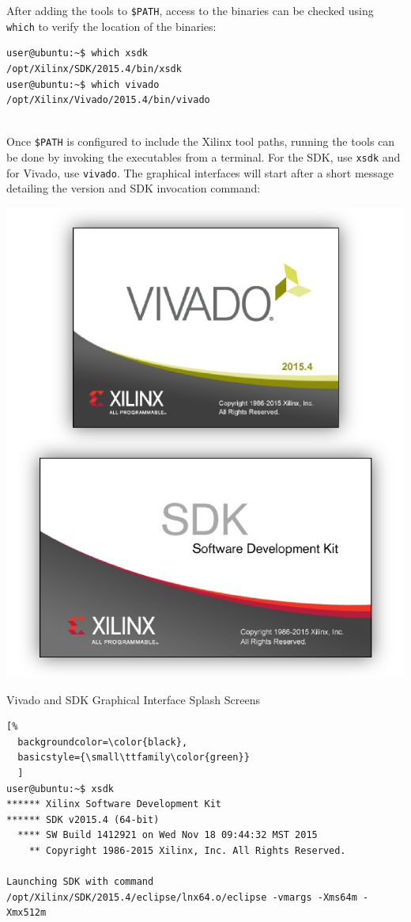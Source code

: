 \noindent
After adding the tools to \texttt{\$PATH}, access to the binaries can be checked using \texttt{which} to verify the location of the binaries: \\

\begin{lstlisting}
user@ubuntu:~$ which xsdk
/opt/Xilinx/SDK/2015.4/bin/xsdk
user@ubuntu:~$ which vivado
/opt/Xilinx/Vivado/2015.4/bin/vivado
\end{lstlisting}

~\\
\noindent
Once \texttt{\$PATH} is configured to include the Xilinx tool paths, running the tools can be done by invoking the executables from a terminal. For the SDK, use \texttt{xsdk} and for Vivado, use \texttt{vivado}. The graphical interfaces will start after a short message detailing the version and SDK invocation command:

\begin{marginfigure}
	\centering
	\includegraphics{images/SDK_Vivado_Splash.png}
	\caption[Vivado and SDK Graphical Interface Splash Screens]{Vivado and SDK Graphical Interface Splash Screens}
\end{marginfigure}


\begin{lstlisting}[%
  backgroundcolor=\color{black},
  basicstyle={\small\ttfamily\color{green}}
  ]
user@ubuntu:~$ xsdk
****** Xilinx Software Development Kit
****** SDK v2015.4 (64-bit)
  **** SW Build 1412921 on Wed Nov 18 09:44:32 MST 2015
    ** Copyright 1986-2015 Xilinx, Inc. All Rights Reserved.

Launching SDK with command /opt/Xilinx/SDK/2015.4/eclipse/lnx64.o/eclipse -vmargs -Xms64m -Xmx512m
\end{lstlisting}



